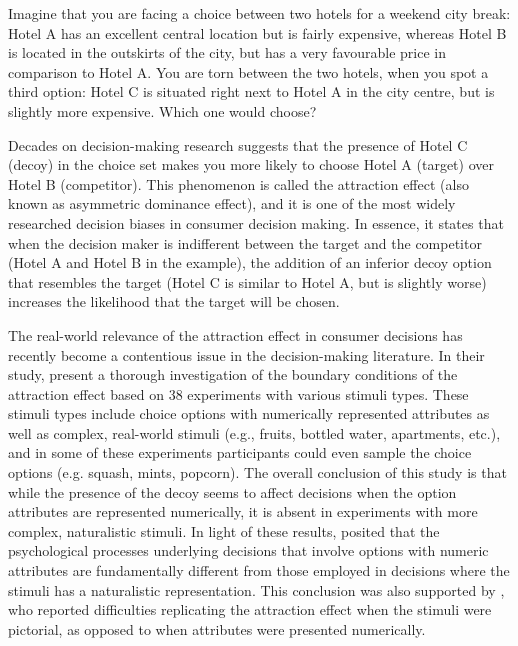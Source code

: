 \documentclass[12pt, a4paper]{article}
\begin{document}
Imagine that you are facing a choice between two hotels for a weekend city break: Hotel A has an excellent central location but is fairly expensive, whereas Hotel B is located in the outskirts of the city, but has a very favourable price in comparison to Hotel A. You are torn between the two hotels, when you spot a third option: Hotel C is situated right next to Hotel A in the city centre, but is slightly more expensive. Which one would choose?

Decades on decision-making research suggests that the presence of Hotel C (decoy) in the choice set makes you more likely to choose Hotel A (target) over Hotel B (competitor). This phenomenon is called the attraction effect (also known as asymmetric dominance effect), and it is one of the most widely researched decision biases in consumer decision making. In essence, it states that when the decision maker is indifferent between the target and the competitor (Hotel A and Hotel B in the example), the addition of an inferior decoy option that resembles the target (Hotel C is similar to Hotel A, but is slightly worse) increases the likelihood that the target will be chosen.



The real-world relevance of the attraction effect in consumer decisions has recently become a contentious issue in the decision-making literature. In their study,  present a thorough investigation of the boundary conditions of the attraction effect based on 38 experiments with various stimuli types. These stimuli types include choice options with numerically represented attributes as well as complex, real-world stimuli (e.g., fruits, bottled water, apartments, etc.), and  in some of these experiments participants could even sample the choice options (e.g. squash, mints, popcorn). The overall conclusion of this study is that while the presence of the decoy seems to affect decisions when the option attributes are represented numerically, it is absent in experiments with more complex, naturalistic stimuli. In light of these results, \citeauthor{Frederick2014} posited that the psychological processes underlying decisions that involve options with numeric attributes are fundamentally different from those employed in decisions where the stimuli has a naturalistic representation. This conclusion was also supported by , who reported difficulties replicating the attraction effect when the stimuli were pictorial, as opposed to when attributes were presented numerically.
\end{document}

